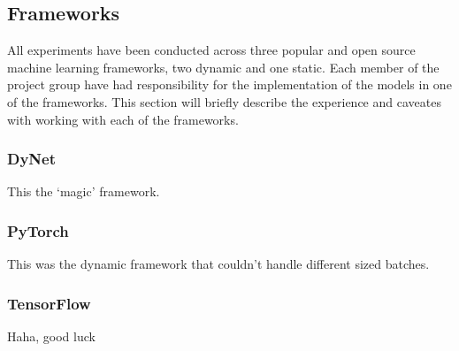 

\subsection{Frameworks}

All experiments have been conducted across three popular and open source machine
learning frameworks, two dynamic and one static. Each member of the project
group have had responsibility for the implementation of the models in one of the
frameworks. This section will briefly describe the experience and caveates with
working with each of the frameworks.


\subsubsection{DyNet}

This the `magic' framework.


\subsubsection{PyTorch}

This was the dynamic framework that couldn't handle different sized batches.


\subsubsection{TensorFlow}

Haha, good luck


